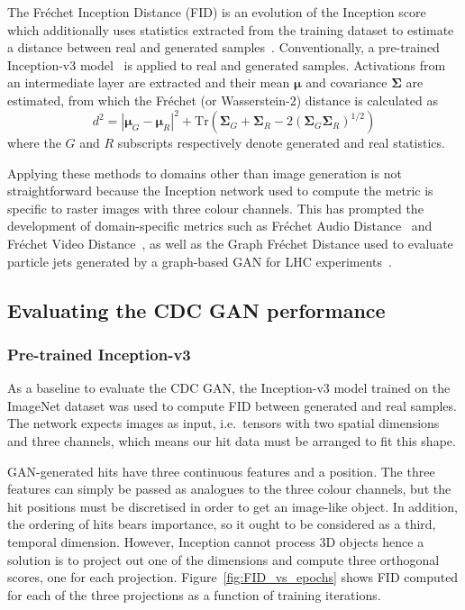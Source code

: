 The Fréchet Inception Distance (FID) is an evolution of the Inception score
which additionally uses statistics extracted from the training dataset to
estimate a distance between real and generated
samples~\cite{10.5555/3295222.3295408}. Conventionally, a pre-trained
Inception-v3 model~\cite{7780677} is applied to real and generated samples.
Activations from an intermediate layer are extracted and their mean $\bm{\mu}$
and covariance $\bm{\Sigma}$ are estimated, from which the Fréchet (or
Wasserstein-2) distance is calculated as
\begin{equation}
d^2 = | \bm{\mu}_G - \bm{\mu}_R |^2 + 
    \mathrm{Tr}(\bm{\Sigma}_G + \bm{\Sigma}_R - 
    2(\bm{\Sigma}_G \bm{\Sigma}_R)^{1/2})    
\end{equation}
where the $G$ and $R$ subscripts respectively denote generated and real statistics.

Applying these methods to domains other than image generation is not
straightforward because the Inception network used to compute the metric is
specific to raster images with three colour channels. This has prompted the
development of domain-specific metrics such as Fréchet Audio
Distance~\cite{kilgour19_interspeech} and Fréchet Video
Distance~\cite{Unterthiner2018TowardsAG}, as well as the Graph Fréchet Distance
used to evaluate particle jets generated by a graph-based GAN for LHC
experiments~\cite{kansal2020graph}.



\subsection{Evaluating the CDC GAN performance}

\subsubsection{Pre-trained Inception-v3}
As a baseline to evaluate the CDC GAN, the Inception-v3 model trained on the
ImageNet dataset was used to compute FID between generated and real samples. The
network expects images as input, i.e.\ tensors with two spatial dimensions and
three channels, which means our hit data must be arranged to fit this shape.

GAN-generated hits have three continuous features and a position. The three
features can simply be passed as analogues to the three colour channels, but the
hit positions must be discretised in order to get an image-like object. In
addition, the ordering of hits bears importance, so it ought to be considered as a
third, temporal dimension. However, Inception cannot process 3D objects hence a
solution is to project out one of the dimensions and compute three orthogonal
scores, one for each projection. Figure~\ref{fig:FID_vs_epochs} shows FID
computed for each of the three projections as a function of training iterations.


